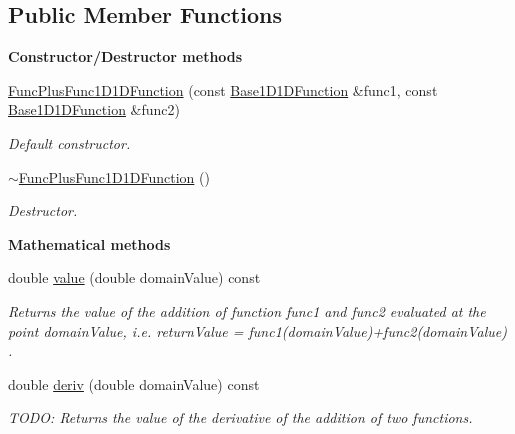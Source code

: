 \subsection*{Public Member Functions}
\begin{Indent}{\bf Constructor/\-Destructor methods}\par
\begin{DoxyCompactItemize}
\item 
\hyperlink{class_q_u_e_s_o_1_1_func_plus_func1_d1_d_function_a4a94be2216d37b20604485b4bb19bd0a}{Func\-Plus\-Func1\-D1\-D\-Function} (const \hyperlink{class_q_u_e_s_o_1_1_base1_d1_d_function}{Base1\-D1\-D\-Function} \&func1, const \hyperlink{class_q_u_e_s_o_1_1_base1_d1_d_function}{Base1\-D1\-D\-Function} \&func2)
\begin{DoxyCompactList}\small\item\em Default constructor. \end{DoxyCompactList}\item 
\hyperlink{class_q_u_e_s_o_1_1_func_plus_func1_d1_d_function_a86c5c243f2c16da8582c55b597e55823}{$\sim$\-Func\-Plus\-Func1\-D1\-D\-Function} ()
\begin{DoxyCompactList}\small\item\em Destructor. \end{DoxyCompactList}\end{DoxyCompactItemize}
\end{Indent}
\begin{Indent}{\bf Mathematical methods}\par
\begin{DoxyCompactItemize}
\item 
double \hyperlink{class_q_u_e_s_o_1_1_func_plus_func1_d1_d_function_a9e7a69d195d586fa982c6088ff6a7007}{value} (double domain\-Value) const 
\begin{DoxyCompactList}\small\item\em Returns the value of the addition of function {\ttfamily func1} and {\ttfamily func2} evaluated at the point {\ttfamily domain\-Value}, i.\-e. return\-Value = {\ttfamily func1(domain\-Value)+func2(domain\-Value) }. \end{DoxyCompactList}\item 
double \hyperlink{class_q_u_e_s_o_1_1_func_plus_func1_d1_d_function_a37e3b0d0b5655b555cde6674e382a36e}{deriv} (double domain\-Value) const 
\begin{DoxyCompactList}\small\item\em T\-O\-D\-O\-: Returns the value of the derivative of the addition of two functions. \end{DoxyCompactList}\end{DoxyCompactItemize}
\end{Indent}
